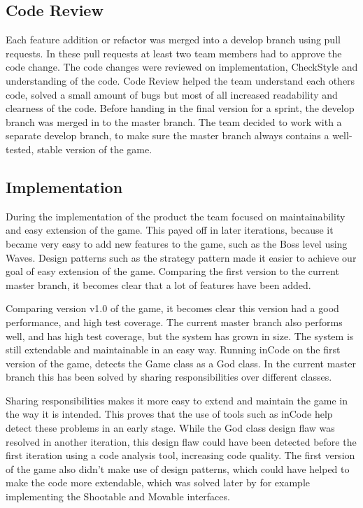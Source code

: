\documentclass[10pt]{article}
\begin{document}
\subsection*{Code Review}
Each feature addition or refactor was merged into a develop branch using pull requests. In these pull requests at least two team members had to approve the code change. The code changes were reviewed on implementation, CheckStyle and understanding of the code. Code Review helped the team understand each others code, solved a small amount of bugs but most of all increased readability and clearness of the code. Before handing in the final version for a sprint, the develop branch was merged in to the master branch. The team decided to work with a separate develop branch, to make sure the master branch always contains a well-tested, stable version of the game.

\subsection*{Implementation}
During the implementation of the product the team focused on maintainability and easy extension of the game. This payed off in later iterations, because it became very easy to add new features to the game, such as the Boss level using Waves. Design patterns such as the strategy pattern made it easier to achieve our goal of easy extension of the game. Comparing the first version to the current master branch, it becomes clear that a lot of features have been added. 

Comparing version v1.0 of the game, it becomes clear this version had a good performance, and high test coverage. The current master branch also performs well, and has high test coverage, but the system has grown in size. The system is still extendable and maintainable in an easy way. Running inCode on the first version of the game, detects the Game class as a God class. In the current master branch this has been solved by sharing responsibilities over different classes. 

Sharing responsibilities makes it more easy to extend and maintain the game in the way it is intended. This proves that the use of tools such as inCode help detect these problems in an early stage. While the God class design flaw was resolved in another iteration, this design flaw could have been detected before the first iteration using a code analysis tool, increasing code quality. The first version of the game also didn't make use of design patterns, which could have helped to make the code more extendable, which was solved later by for example implementing the Shootable and Movable interfaces.
\end{document}
